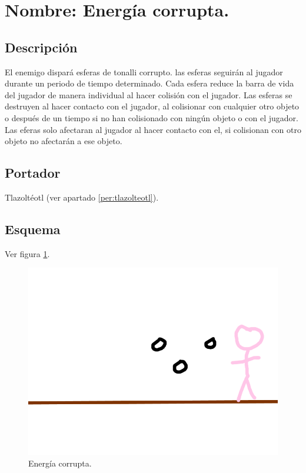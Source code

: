 \section{Nombre: Energía corrupta.} \label{hab.CorrupEner}
\subsection{Descripción}
El enemigo dispará esferas de tonalli corrupto. las esferas seguirán al jugador durante un periodo de tiempo determinado. Cada esfera reduce la barra de vida del jugador de manera individual al hacer colisión con el jugador. Las esferas se destruyen al hacer contacto con el jugador, al colisionar con cualquier otro objeto o después de un tiempo si no han colisionado con ningún objeto o con el jugador. Las eferas solo afectaran al jugador al hacer contacto con el, si colisionan con otro objeto no afectarán a ese objeto. 
\subsection{Portador}
Tlazoltéotl (ver apartado \ref{per:tlazolteotl}).
\subsection{Esquema}
			Ver figura \ref{fig:energiaC}.
			\begin{figure}
				\centering
				\includegraphics[height=0.2 \textheight]{Imagenes/energiaC}
				\caption{Energía corrupta.}
				\label{fig:energiaC}
			\end{figure}	